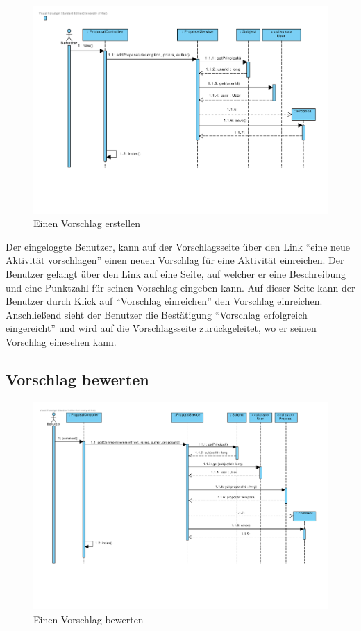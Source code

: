 \begin{figure}[H]
  \centering
  \includegraphics[width=\textwidth, clip]{gfx/vorschlag_erstellen}
  \caption{Einen Vorschlag erstellen}
\end{figure}

Der eingeloggte Benutzer, kann auf der Vorschlagsseite über den Link
``eine neue Aktivität vorschlagen'' einen neuen Vorschlag für eine
Aktivität einreichen. Der Benutzer gelangt über den Link auf eine
Seite, auf welcher er eine Beschreibung und eine Punktzahl für seinen Vorschlag
 eingeben kann. Auf dieser Seite kann der Benutzer durch Klick auf
 ``Vorschlag einreichen'' den Vorschlag einreichen. Anschließend sieht
 der Benutzer die Bestätigung ``Vorschlag erfolgreich eingereicht''
 und wird auf die Vorschlagsseite zurückgeleitet, wo er seinen
 Vorschlag einesehen kann.
 
\subsection{Vorschlag bewerten}

\begin{figure}[H]
  \centering
  \includegraphics[width=\textwidth, clip]{gfx/vorschlag_bewerten}
  \caption{Einen Vorschlag bewerten}
\end{figure}

